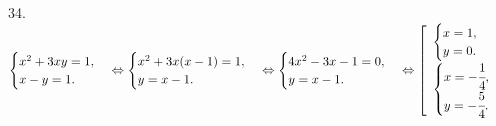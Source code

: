 34. $\begin{cases} x^2+3xy=1,\\ x-y=1.\end{cases}\Leftrightarrow\begin{cases} x^2+3x(x-1)=1,\\ y=x-1.\end{cases}
\Leftrightarrow\begin{cases} 4x^2-3x-1=0,\\ y=x-1.\end{cases}\Leftrightarrow\left[\begin{array}{l}\begin{cases} x=1,\\ y=0.\end{cases}\\ \begin{cases} x=-\cfrac{1}{4},\\ y=-\cfrac{5}{4}.\end{cases}\end{array}\right.$\\
